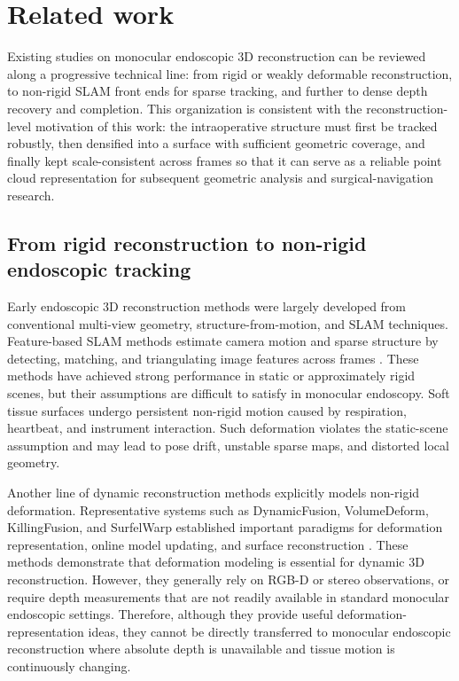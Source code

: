 \documentclass[pdflatex,sn-mathphys-num]{sn-jnl}
\begin{document}
\section{Related work}\label{sec:related}

Existing studies on monocular endoscopic 3D reconstruction can be reviewed along a progressive technical line: from rigid or weakly deformable reconstruction, to non-rigid SLAM front ends for sparse tracking, and further to dense depth recovery and completion. This organization is consistent with the reconstruction-level motivation of this work: the intraoperative structure must first be tracked robustly, then densified into a surface with sufficient geometric coverage, and finally kept scale-consistent across frames so that it can serve as a reliable point cloud representation for subsequent geometric analysis and surgical-navigation research.

\subsection{From rigid reconstruction to non-rigid endoscopic tracking}

Early endoscopic 3D reconstruction methods were largely developed from conventional multi-view geometry, structure-from-motion, and SLAM techniques. Feature-based SLAM methods estimate camera motion and sparse structure by detecting, matching, and triangulating image features across frames \cite{bib3,bib4}. These methods have achieved strong performance in static or approximately rigid scenes, but their assumptions are difficult to satisfy in monocular endoscopy. Soft tissue surfaces undergo persistent non-rigid motion caused by respiration, heartbeat, and instrument interaction. Such deformation violates the static-scene assumption and may lead to pose drift, unstable sparse maps, and distorted local geometry.

Another line of dynamic reconstruction methods explicitly models non-rigid deformation. Representative systems such as DynamicFusion, VolumeDeform, KillingFusion, and SurfelWarp established important paradigms for deformation representation, online model updating, and surface reconstruction \cite{bib23,bib24,bib25,bib26}. These methods demonstrate that deformation modeling is essential for dynamic 3D reconstruction. However, they generally rely on RGB-D or stereo observations, or require depth measurements that are not readily available in standard monocular endoscopic settings. Therefore, although they provide useful deformation-representation ideas, they cannot be directly transferred to monocular endoscopic reconstruction where absolute depth is unavailable and tissue motion is continuously changing.
\end{document}
